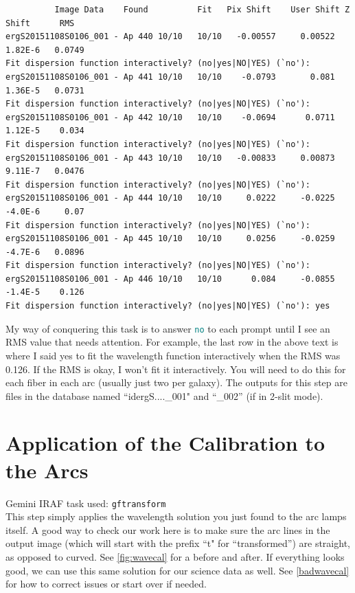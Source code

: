 \documentclass[12pt]{report}
\newcommand{\ty}[1]{\textcolor{teal}{\texttt{#1}}}
\begin{document}
\begin{verbatim}
          Image Data    Found          Fit   Pix Shift    User Shift Z Shift      RMS
ergS20151108S0106_001 - Ap 440 10/10   10/10   -0.00557     0.00522  1.82E-6   0.0749
Fit dispersion function interactively? (no|yes|NO|YES) (`no'): 
ergS20151108S0106_001 - Ap 441 10/10   10/10    -0.0793       0.081  1.36E-5   0.0731
Fit dispersion function interactively? (no|yes|NO|YES) (`no'): 
ergS20151108S0106_001 - Ap 442 10/10   10/10    -0.0694      0.0711  1.12E-5    0.034
Fit dispersion function interactively? (no|yes|NO|YES) (`no'): 
ergS20151108S0106_001 - Ap 443 10/10   10/10   -0.00833     0.00873  9.11E-7   0.0476
Fit dispersion function interactively? (no|yes|NO|YES) (`no'): 
ergS20151108S0106_001 - Ap 444 10/10   10/10     0.0222     -0.0225  -4.0E-6     0.07
Fit dispersion function interactively? (no|yes|NO|YES) (`no'): 
ergS20151108S0106_001 - Ap 445 10/10   10/10     0.0256     -0.0259  -4.7E-6   0.0896
Fit dispersion function interactively? (no|yes|NO|YES) (`no'): 
ergS20151108S0106_001 - Ap 446 10/10   10/10      0.084     -0.0855  -1.4E-5    0.126
Fit dispersion function interactively? (no|yes|NO|YES) (`no'): yes
\end{verbatim}

My way of conquering this task is to answer \ty{no} to each prompt until I see an RMS value that needs attention. For example, the last row in the above text is where I said yes to fit the wavelength function interactively when the RMS was 0.126. If the RMS is okay, I won't fit it interactively. You will need to do this for each fiber in each arc (usually just two per galaxy). The outputs for this step are files in the database named ``idergS....\_001" and ``\_002'' (if in 2-slit mode).

\section{Application of the Calibration to the Arcs}

\noindent Gemini IRAF task used: \texttt{gftransform}\\

\noindent This step simply applies the wavelength solution you just found to the arc lamps itself. A good way to check our work here is to make sure the arc lines in the output image (which will start with the prefix ``t" for ``transformed'') are straight, as opposed to curved. See \autoref{fig:wavecal} for a before and after. If everything looks good, we can use this same solution for our science data as well. See \autoref{badwavecal} for how to correct issues or start over if needed. 
\end{document}
